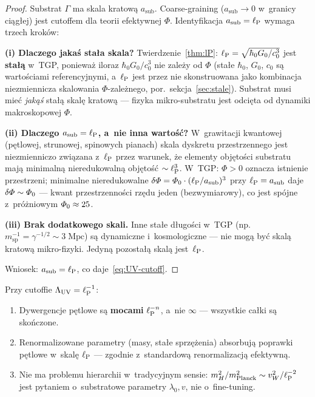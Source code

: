 \begin{proof}
Substrat $\Gamma$ ma skala kratową $a_{\mathrm{sub}}$.
Coarse-graining ($a_{\mathrm{sub}} \to 0$ w~granicy ciągłej)
jest cutoffem dla teorii efektywnej $\Phi$.
Identyfikacja $a_{\mathrm{sub}} = \ell_{\mathrm{P}}$ wymaga trzech kroków:

\textbf{(i) Dlaczego jakaś stała skala?}
Twierdzenie~\ref{thm:lP}: $\ell_{\mathrm{P}} = \sqrt{\hbar_0 G_0/c_0^3}$ jest
\textbf{stałą} w~TGP, ponieważ iloraz $\hbar_0 G_0/c_0^3$ nie zależy
od $\Phi$ (stałe $\hbar_0$, $G_0$, $c_0$ są wartościami referencyjnymi,
a~$\ell_{\mathrm{P}}$ jest przez nie skonstruowana jako kombinacja niezmiennicza
skalowania $\Phi$-zależnego, por.\ sekcja~\ref{sec:stale}).
Substrat musi mieć \emph{jakąś} stałą skalę kratową --- fizyka
mikro-substratu jest odcięta od dynamiki makroskopowej $\Phi$.

\textbf{(ii) Dlaczego $a_{\mathrm{sub}} = \ell_{\mathrm{P}}$, a~nie inna wartość?}
W~grawitacji kwantowej (pętlowej, strunowej, spinowych pianach)
skala dyskretu przestrzennego jest niezmienniczo związana z~$\ell_{\mathrm{P}}$
przez warunek, że elementy objętości substratu mają minimalną
nieredukowalną objętość $\sim \ell_{\mathrm{P}}^3$.
W~TGP: $\Phi > 0$ oznacza istnienie przestrzeni; minimalne
nieredukowalne $\delta\varPhi = \varPhi_0 \cdot (\ell_{\mathrm{P}}/a_{\mathrm{sub}})^3$
przy $\ell_{\mathrm{P}} = a_{\mathrm{sub}}$ daje $\delta\varPhi \sim \varPhi_0$ ---
kwant przestrzenności rzędu jeden (bezwymiarowy), co jest
spójne z~próżniowym $\varPhi_0 \approx 25$.

\textbf{(iii) Brak dodatkowego skali.}
Inne stałe długości w~TGP (np.\ $m_{\mathrm{sp}}^{-1} = \gamma^{-1/2}
\sim 3\;\mathrm{Mpc}$) są dynamiczne i~kosmologiczne --- nie mogą
być skalą kratową mikro-fizyki. Jedyną pozostałą skalą jest~$\ell_{\mathrm{P}}$.

Wniosek: $a_{\mathrm{sub}} = \ell_{\mathrm{P}}$, co daje~\eqref{eq:UV-cutoff}.
\end{proof}

\begin{corollary}\label{cor:finite-renorm}
Przy cutoffie $\Lambda_{\mathrm{UV}} = \ell_{\mathrm{P}}^{-1}$:
\begin{enumerate}[nosep]
    \item Dywergencje pętlowe są \textbf{mocami} $\ell_{\mathrm{P}}^{-n}$,
          a~nie $\infty$ --- wszystkie całki są skończone.
    \item Renormalizowane parametry (masy, stałe sprzężenia)
          absorbują poprawki pętlowe w~skalę $\ell_{\mathrm{P}}$ --- zgodnie
          z~standardową renormalizacją efektywną.
    \item Nie ma problemu hierarchii w~tradycyjnym sensie:
          $m_H^2 / m_{\mathrm{Planck}}^2 \sim v_W^2/\ell_{\mathrm{P}}^{-2}$
          jest pytaniem o~substratowe parametry $\lambda_0, v$,
          nie o~fine-tuning.
\end{enumerate}
\end{corollary}

